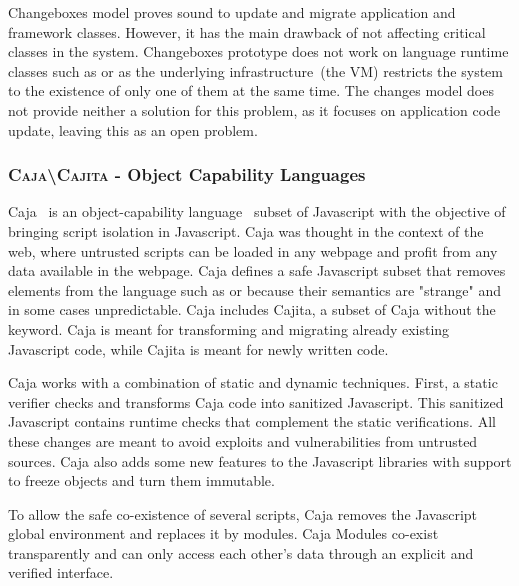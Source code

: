 Changeboxes model proves sound to update and migrate application and framework classes. However, it has the main drawback of not affecting critical classes in the system. Changeboxes prototype does not work on language runtime classes such as  or  as the underlying infrastructure~(the VM) restricts the system to the existence of only one of them at the same time. The changes model does not provide neither a solution for this problem, as it focuses on application code update, leaving this as an open problem.

\subsubsection*{\textsc{Caja\textbackslash Cajita} - Object Capability Languages}

Caja~\cite{Mill08a} is an object-capability language~\cite{Levy84a,Mill03a,Spoo00a} subset of Javascript with the objective of bringing script isolation in Javascript. Caja was thought in the context of the web, where untrusted scripts can be loaded in any webpage and profit from any data available in the webpage. Caja defines a safe Javascript subset that removes elements from the language such as  or  because their semantics are "strange" and in some cases unpredictable. Caja includes Cajita, a subset of Caja without the  keyword. Caja is meant for transforming and migrating already existing Javascript code, while Cajita is meant for newly written code.

Caja works with a combination of static and dynamic techniques. First, a static verifier checks and transforms Caja code into sanitized Javascript. This sanitized Javascript contains runtime checks that complement the static verifications. All these changes are meant to avoid exploits and vulnerabilities from untrusted sources. Caja also adds some new features to the Javascript libraries with support to freeze objects and turn them immutable. 

To allow the safe co-existence of several scripts, Caja removes the Javascript global environment and replaces it by modules. Caja Modules co-exist transparently and can only access each other's data through an explicit and verified interface.
%


